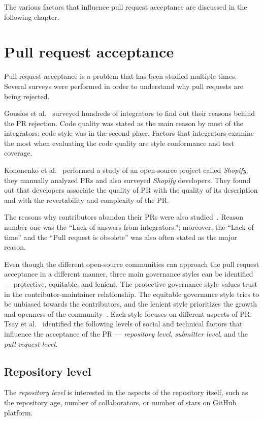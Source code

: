 \documentclass[digital,oneside,oldtable,nolof,nolot,nocover]{fithesis4}
\begin{document}
The various factors that influence pull request acceptance are discussed in the
following chapter.
\chapter{Pull request acceptance}
\label{sec:org4af55ac}
Pull request acceptance is a problem that has been studied multiple
times. Several surveys were performed in order to understand why pull requests
are being rejected.

Gousios et al.~\cite{integrator} surveyed hundreds of integrators to find out
their reasons behind the PR rejection. Code quality was stated as the main
reason by most of the integrators; code style was in the second place.
Factors that integrators examine the most when evaluating the code quality are
style conformance and test coverage.

Kononenko et al.~\cite{shopify} performed a study of an open-source project
called \emph{Shopify}; they manually analyzed PRs and also surveyed \emph{Shopify}
developers. They found out that developers associate the quality of PR with
the quality of its description and with the revertability and complexity of
the PR.

The reasons why contributors abandon their PRs were also
studied~\cite{abandonment}. Reason number one was the ``Lack of answers from
integrators.''; moreover, the ``Lack of time'' and the ``Pull request is
obsolete'' was also often stated as the major reason.

Even though the different open-source communities can approach the pull request acceptance in
a different manner, three main governance styles can be
identified --- protective, equitable, and lenient. The protective governance style
values trust in the contributor-maintainer relationship. The equitable
governance style tries to be unbiased towards the contributors, and the
lenient style prioritizes the growth and openness of the community~\cite{foss}.
Each style focuses on different aspects of PR. Tsay et al.~\cite{social}
identified the following levels of social and technical factors that influence
the acceptance of the PR --- \emph{repository level}, \emph{submitter level}, and the
\emph{pull request level}.
\section{Repository level}
\label{sec:org262be4a}
The \emph{repository level} is interested in the aspects of the repository itself,
such as the repository age, number of collaborators, or number of stars on
GitHub platform.
\end{document}
